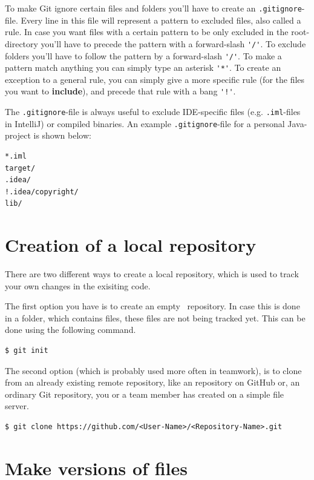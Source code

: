 \documentclass[a4paper, 12pt]{article}
\begin{document}
		To make Git ignore certain files and folders you'll have to create an \lstinline|.gitignore|-file. Every line in this file will represent a pattern to excluded files, also called a rule. In case you want files with a certain pattern to be only excluded in the root-directory you'll have to precede the pattern with a forward-slash \lstinline|'/'|. To exclude folders you'll have to follow the pattern by a forward-slash \lstinline|'/'|. To make a pattern match anything you can simply type an asterisk \lstinline|'*'|. To create an exception to a general rule, you can simply give a more specific rule (for the files you want to \textbf{include}), and precede that rule with a bang \lstinline|'!'|.
		
		The \lstinline|.gitignore|-file is always useful to exclude IDE-specific files (e.g. \lstinline|.iml|-files in IntelliJ) or compiled binaries. An example \lstinline|.gitignore|-file for a personal Java-project is shown below:
		
		\begin{lstlisting}
*.iml
target/
.idea/
!.idea/copyright/
lib/
		\end{lstlisting}

	\section{Creation of a local repository}

		There are two different ways to create a local repository, which is used to track your own changes in the exisiting code.

		The first option you have is to create an \glqq empty\grqq~ repository. In case this is done in a folder, which contains files, these files are not being tracked yet. This can be done using the following command.

		\begin{lstlisting}
$ git init
		\end{lstlisting}

		The second option (which is probably used more often in teamwork), is to clone from an already existing remote repository, like an repository on GitHub or, an ordinary Git repository, you or a team member has created on a simple file server.

		\begin{lstlisting}
$ git clone https://github.com/<User-Name>/<Repository-Name>.git
		\end{lstlisting}

	\section{Make versions of files}
	
\end{document}
